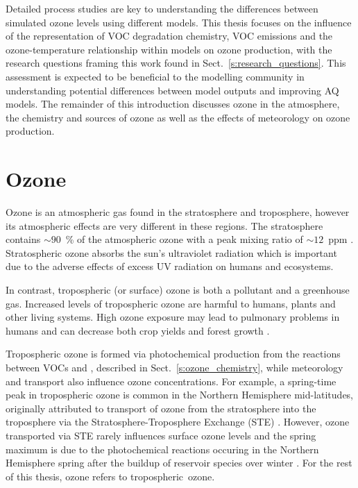 Detailed process studies are key to understanding the differences between simulated ozone levels using different models.
This thesis focuses on the influence of the representation of VOC degradation chemistry, VOC emissions and the ozone-temperature relationship within models on ozone production, with the research questions framing this work found in Sect.~\ref{s:research_questions}.
This assessment is expected to be beneficial to the modelling community in understanding potential differences between model outputs and improving AQ models.
The remainder of this introduction discusses ozone in the atmosphere, the chemistry and sources of ozone as well as the effects of meteorology on ozone production.

\section{Ozone} \label{s:ozone}
Ozone is an atmospheric gas found in the stratosphere and troposphere, however its atmospheric effects are very different in these regions.
The stratosphere contains ${\sim}90$~\% of the atmospheric ozone with a peak mixing ratio of ${\sim}12$~ppm \citep{Seinfeld:2006}.
Stratospheric ozone absorbs the sun's ultraviolet radiation which is important due to the adverse effects of excess UV radiation on humans and ecosystems.

In contrast, tropospheric (or surface) ozone is both a pollutant and a greenhouse gas. 
Increased levels of tropospheric ozone are harmful to humans, plants and other living systems. 
High ozone exposure may lead to pulmonary problems in humans and can decrease both crop yields and forest growth \citep{WMO:2010}. 

Tropospheric ozone is formed via photochemical production from the reactions between VOCs and , described in Sect.~\ref{s:ozone_chemistry}, while meteorology and transport also influence ozone concentrations.
For example, a spring-time peak in tropospheric ozone is common in the Northern Hemisphere mid-latitudes, originally attributed to transport of ozone from the stratosphere into the troposphere via the Stratosphere-Troposphere Exchange (STE) \citep{Monks:2000}.
However, ozone transported via STE rarely influences surface ozone levels \citep{Lelieveld:2000} and the spring maximum is due to the photochemical reactions occuring in the Northern Hemisphere spring after the buildup of reservoir species over winter \citep{Penkett:1986}.
For the rest of this thesis, ozone refers to tropospheric~ozone.

